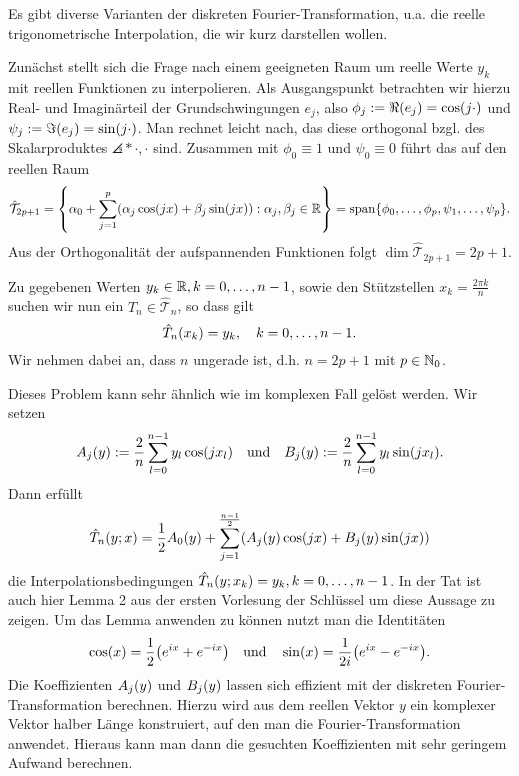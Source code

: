 \documentclass{lecture}
\begin{document}
    \begin{remark}
        Es gibt diverse Varianten der diskreten Fourier-Transformation, u.a. die reelle trigonometrische Interpolation, die wir kurz darstellen wollen.

        Zunächst stellt sich die Frage nach einem geeigneten Raum um reelle Werte \(y_k\) mit reellen Funktionen zu interpolieren.
        Als Ausgangspunkt betrachten wir hierzu Real- und Imaginärteil der Grundschwingungen \(e_j\), also \(\phi_j := \Re\parentheses*{e_j} = \cos\parentheses*{j\cdot}\) und \(\psi_j := \Im\parentheses*{e_j} = \sin\parentheses*{j\cdot}\).
        Man rechnet leicht nach, das diese orthogonal bzgl. des Skalarproduktes \(\angles*{\cdot, \cdot}\) sind.
        Zusammen mit \(\phi_0 \equiv 1\) und \(\psi_0 \equiv 0\) führt das auf den reellen Raum
        \[
            \hat{\mathcal{T}}_{2p + 1} = \braces*{\alpha_0 + \sum_{j = 1}^p\parentheses*{\alpha_j\cos\parentheses*{jx} + \beta_j\sin\parentheses*{jx}} : \alpha_j, \beta_j \in \R} = \setspan\braces*{\phi_0, \ldots, \phi_p, \psi_1, \ldots, \psi_p}.
        \]
        Aus der Orthogonalität der aufspannenden Funktionen folgt \(\dim\hat{\mathcal{T}}_{2p + 1} = 2p + 1\).

        Zu gegebenen Werten \(y_k \in \mathbb{R}, k = 0, \ldots, n - 1\), sowie den Stützstellen \(x_k = \frac{2\pi k}{n}\) suchen wir nun ein \(\hat{T}_n \in \hat{\mathcal{T}}_n\), so dass gilt
        \[
            \hat{T}_n\parentheses*{x_k} = y_k, \quad k = 0, \ldots, n - 1.
        \]
        Wir nehmen dabei an, dass \(n\) ungerade ist, d.h. \(n = 2p + 1\) mit \(p \in \mathbb{N}_0\).

        Dieses Problem kann sehr ähnlich wie im komplexen Fall gelöst werden.
        Wir setzen
        \[
            A_j\parentheses*{y} := \frac{2}{n}\sum_{l = 0}^{n - 1}y_l\cos\parentheses*{jx_l} \quad \text{und} \quad B_j\parentheses*{y} := \frac{2}{n}\sum_{l = 0}^{n - 1}y_l\sin\parentheses*{jx_l}.
        \]
        Dann erfüllt
        \[
            \hat{T}_n\parentheses*{y; x} = \frac{1}{2}A_0\parentheses*{y} + \sum_{j = 1}^{\frac{n - 1}{2}}\parentheses*{A_j\parentheses*{y}\cos\parentheses*{jx} + B_j\parentheses*{y}\sin\parentheses*{jx}}
        \]
        die Interpolationsbedingungen \(\hat{T}_n\parentheses*{y; x_k} = y_k, k = 0, \ldots, n - 1\).
        In der Tat ist auch hier Lemma 2 aus der ersten Vorlesung der Schlüssel um diese Aussage zu zeigen.
        Um das Lemma anwenden zu können nutzt man die Identitäten
        \[
            \cos\parentheses*{x} = \frac{1}{2}\parentheses*{e^{ix} + e^{-ix}} \quad \text{und} \quad \sin\parentheses*{x} = \frac{1}{2i}\parentheses*{e^{ix} - e^{-ix}}.
        \]
        Die Koeffizienten \(A_j\parentheses*{y}\) und \(B_j\parentheses*{y}\) lassen sich effizient mit der diskreten Fourier-Transformation berechnen.
        Hierzu wird aus dem reellen Vektor \(y\) ein komplexer Vektor halber Länge konstruiert, auf den man die Fourier-Transformation anwendet.
        Hieraus kann man dann die gesuchten Koeffizienten mit sehr geringem Aufwand berechnen.
    \end{remark}
\end{document}
